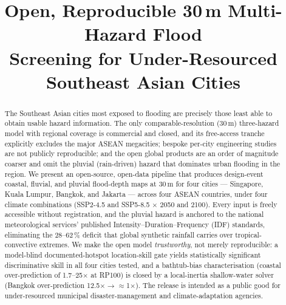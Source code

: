 \documentclass[conference]{IEEEtran}
\begin{document}
\title{Open, Reproducible 30\,m Multi-Hazard Flood\\
Screening for Under-Resourced Southeast Asian Cities}

\author{%
\and
{}
%
}

\maketitle

\begin{abstract}
The Southeast Asian cities most exposed to flooding are precisely those least able
to obtain usable hazard information. The only comparable-resolution (30\,m)
three-hazard model with regional coverage is commercial and closed, and its
free-access tranche explicitly excludes the major ASEAN megacities; bespoke per-city
engineering studies are not publicly reproducible; and the open global products are
an order of magnitude coarser and omit the pluvial (rain-driven) hazard that
dominates urban flooding in the region. We present an open-source, open-data
pipeline that produces design-event coastal, fluvial, and pluvial flood-depth maps
at 30\,m for four cities --- Singapore, Kuala Lumpur, Bangkok, and Jakarta ---
across four ASEAN countries, under four climate combinations (SSP2-4.5 and
SSP5-8.5 $\times$ 2050 and 2100). Every input is freely accessible without
registration, and the pluvial hazard is anchored to the national meteorological
services' published Intensity--Duration--Frequency (IDF) standards, eliminating the
28--62\,\% deficit that global synthetic rainfall carries over tropical-convective
extremes. We make the open model \emph{trustworthy}, not merely reproducible: a
model-blind documented-hotspot location-skill gate yields statistically significant
discriminative skill in all four cities tested, and a bathtub-bias characterisation
(coastal over-prediction of 1.7--25$\times$ at RP100) is closed by a local-inertia
shallow-water solver (Bangkok over-prediction 12.5$\times\rightarrow\approx$1$\times$).
The release is intended as a public good for under-resourced municipal
disaster-management and climate-adaptation agencies.
\end{abstract}
\end{document}
